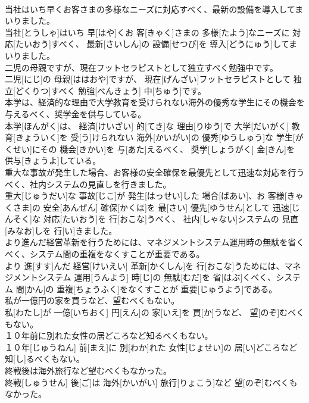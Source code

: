 \documentclass[8pt]{extreport}
\begin{document}
\begin{CJK}{UTF8}{min}
\\	当社はいち早くお客さまの多様なニーズに対応すべく、最新の設備を導入してまいりました。	
\\	当社[とうしゃ]はいち 早[はや]くお 客[きゃく]さまの 多様[たよう]なニーズに 対応[たいおう]すべく、 最新[さいしん]の 設備[せつび]を 導入[どうにゅう]してまいりました。
\\	二児の母親ですが、現在フットセラピストとして独立すべく勉強中です。	
\\	二児[にじ]の 母親[ははおや]ですが、 現在[げんざい]フットセラピストとして 独立[どくりつ]すべく 勉強[べんきょう] 中[ちゅう]です。
\\	本学は、経済的な理由で大学教育を受けられない海外の優秀な学生にその機会を与えるべく、奨学金を供与している。	
\\	本学[ほんがく]は、 経済[けいざい] 的[てき]な 理由[りゆう]で 大学[だいがく] 教育[きょういく]を 受[う]けられない 海外[かいがい]の 優秀[ゆうしゅう]な 学生[がくせい]にその 機会[きかい]を 与[あた]えるべく、 奨学[しょうがく] 金[きん]を 供与[きょうよ]している。
\\	重大な事故が発生した場合、お客様の安全確保を最優先として迅速な対応を行うべく、社内システムの見直しを行きました。	
\\	重大[じゅうだい]な 事故[じこ]が 発生[はっせい]した 場合[ばあい]、お 客様[きゃくさま]の 安全[あんぜん] 確保[かくほ]を 最[さい] 優先[ゆうせん]として 迅速[じんそく]な 対応[たいおう]を 行[おこな]うべく、 社内[しゃない]システムの 見直[みなお]しを 行[い]きました。
\\	より進んだ経営革新を行うためには、マネジメントシステム運用時の無駄を省くべく、システム間の重複をなくすことが重要である。	
\\	より 進[すす]んだ 経営[けいえい] 革新[かくしん]を 行[おこな]うためには、マネジメントシステム 運用[うんよう] 時[じ]の 無駄[むだ]を 省[はぶ]くべく、システム 間[かん]の 重複[ちょうふく]をなくすことが 重要[じゅうよう]である。
\\	私が一億円の家を買うなど、望むべくもない。	
\\	私[わたし]が 一億[いちおく] 円[えん]の 家[いえ]を 買[か]うなど、 望[のぞ]むべくもない。
\\	１０年前に別れた女性の居どころなど知るべくもない。	
\\	１０年[じゅうねん] 前[まえ]に 別[わか]れた 女性[じょせい]の 居[い]どころなど 知[し]るべくもない。
\\	終戦後は海外旅行など望むべくもなかった。	
\\	終戦[しゅうせん] 後[ご]は 海外[かいがい] 旅行[りょこう]など 望[のぞ]むべくもなかった。

\end{CJK}
\end{document}
